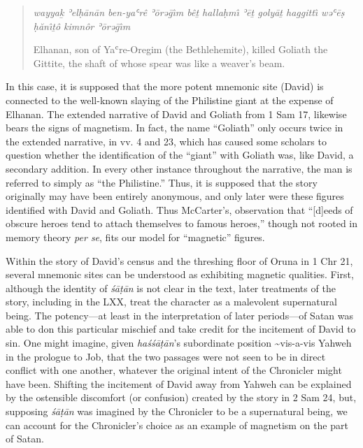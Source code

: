 \begin{quote}
\emph{wayyaḵ ʾelḥānān ben-yaʿrê ʾōrəḡı̂m bêṯ hallaḥmı̂ ʾēṯ golyāṯ haggittı̂
wəʿēṣ ḥănı̂ṯô kimnôr ʾōrəḡı̂m}

Elhanan, son of Yaʿre-Oregim (the Bethlehemite), killed Goliath the
Gittite, the shaft of whose spear was like a weaver's beam.
\end{quote}

In this case, it is supposed that the more potent mnemonic site (David)
is connected to the well-known slaying of the Philistine giant at the
expense of Elhanan. The extended narrative of David and Goliath from 1
Sam 17, likewise bears the signs of magnetism. In fact, the name
``Goliath'' only occurs twice in the extended narrative, in vv. 4 and
23, which has caused some scholars to question whether the
identification of the ``giant'' with Goliath was, like David, a
secondary addition. In every other instance throughout the narrative,
the man is referred to simply as ``the Philistine.'' Thus, it is
supposed that the story originally may have been entirely anonymous, and
only later were these figures identified with David and
Goliath.\autocites[For a fuller account of the textual issues
surrounding the main narrative about David and Goliath,
see,][280--309]{mccarter1980}[and][69--77]{mckenzie2000} Thus
McCarter's, observation that ``{[}d{]}eeds of obscure heroes tend to
attach themselves to famous heroes,''\autocite[450]{mccarter1984} though
not rooted in memory theory \emph{per se}, fits our model for
``magnetic'' figures.

Within the story of David's census and the threshing floor of Oruna in 1
Chr 21, several mnemonic sites can be understood as exhibiting magnetic
qualities. First, although the identity of \emph{śāṭān} is not clear in
the text, later treatments of the story, including in the LXX, treat the
character as a malevolent supernatural being. The potency---at least in
the interpretation of later periods---of Satan was able to don this
particular mischief and take credit for the incitement of David to sin.
One might imagine, given \emph{haśśāṭān}'s subordinate position
\textasciitilde{}vis-a-vis Yahweh in the prologue to Job, that the two
passages were not seen to be in direct conflict with one another,
whatever the original intent of the Chronicler might have been. Shifting
the incitement of David away from Yahweh can be explained by the
ostensible discomfort (or confusion) created by the story in 2 Sam 24,
but, supposing \emph{śāṭān} was imagined by the Chronicler to be a
supernatural being, we can account for the Chronicler's choice as an
example of magnetism on the part of Satan.

